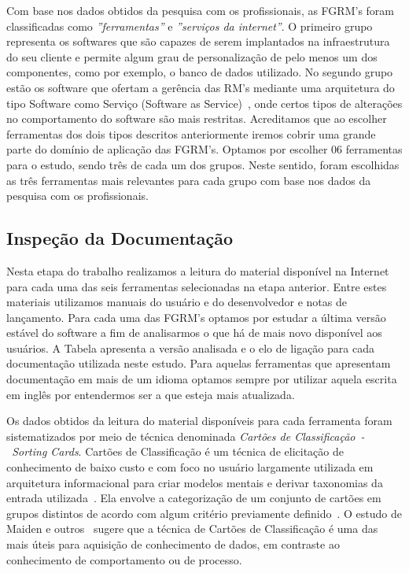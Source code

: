 Com base nos dados obtidos da pesquisa com os profissionais, as FGRM's foram
classificadas como \textit{''ferramentas''} e \textit{''serviços da internet''}.
O primeiro grupo representa os softwares que são capazes de serem implantados na
infraestrutura do seu cliente e permite algum grau de personalização de pelo
menos um dos componentes, como por exemplo, o banco de dados utilizado. No
segundo grupo estão os software que ofertam a gerência das RM's mediante uma
arquitetura do tipo Software como Serviço (Software as
Service)~\cite{fox2013engineering}, onde certos tipos de alterações no
comportamento do software são mais restritas. Acreditamos que ao escolher
ferramentas dos dois tipos descritos anteriormente iremos cobrir uma
grande parte do domínio de aplicação das FGRM's. Optamos por escolher 06
ferramentas para o estudo, sendo três de cada um dos grupos. Neste sentido,
foram escolhidas as três ferramentas mais relevantes para cada grupo com base
nos dados da pesquisa com os profissionais.

\subsection{Inspeção da Documentação}
\label{subsec:inspecao_doumentacao}

Nesta etapa do trabalho realizamos a leitura do material disponível na Internet
para cada uma das seis ferramentas selecionadas na etapa anterior. Entre estes
materiais utilizamos manuais do usuário e do desenvolvedor e notas de
lançamento. Para cada uma das FGRM's optamos por estudar a última versão estável
do software a fim de analisarmos o que há de mais novo disponível aos usuários.
A Tabela apresenta a versão analisada e o elo de ligação para cada documentação
utilizada neste estudo. Para aquelas ferramentas que apresentam documentação em
mais de um idioma optamos sempre por utilizar aquela escrita em inglês por
entendermos ser a que esteja mais atualizada.


Os dados obtidos da leitura do material disponíveis para cada ferramenta foram
sistematizados por meio de técnica denominada \textit{Cartões de
	Classificação~-~Sorting Cards}. Cartões de Classificação é um técnica de
elicitação de conhecimento de baixo custo e com foco no usuário largamente
utilizada em arquitetura informacional para criar modelos mentais e derivar
taxonomias da entrada utilizada~\cite{just2008towards}. Ela envolve a
categorização de um conjunto de cartões em grupos distintos de acordo com algum
critério previamente definido~\cite{mcgee2009software}. O estudo de Maiden e
outros~\cite{maiden1996acre} sugere que a técnica de Cartões de Classificação é
uma das mais úteis para aquisição de conhecimento de dados, em contraste ao
conhecimento de comportamento ou de processo.

